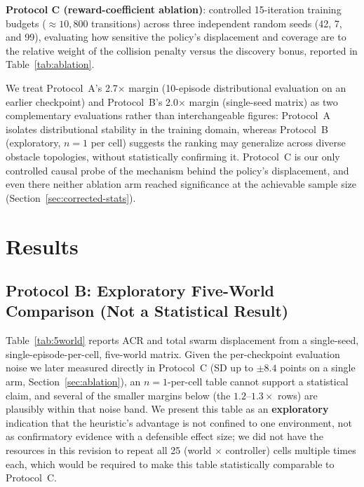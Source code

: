 \documentclass[11pt]{article}
\begin{document}
\noindent\textbf{Protocol C (reward-coefficient ablation)}: controlled
15-iteration training budgets ($\approx 10{,}800$ transitions) across
three independent random seeds (42, 7, and 99), evaluating how sensitive
the policy's displacement and coverage are to the relative weight of the
collision penalty versus the discovery bonus, reported in
Table~\ref{tab:ablation}.

We treat Protocol~A's 2.7$\times$ margin (10-episode distributional
evaluation on an earlier checkpoint) and Protocol~B's 2.0$\times$ margin
(single-seed matrix) as two complementary evaluations rather than
interchangeable figures: Protocol~A isolates distributional stability in
the training domain, whereas Protocol~B (exploratory, $n{=}1$ per cell)
suggests the ranking may generalize across diverse obstacle topologies,
without statistically confirming it. Protocol~C is our only controlled
causal probe of the mechanism behind the policy's displacement, and even
there neither ablation arm reached significance at the achievable sample
size (Section~\ref{sec:corrected-stats}).

\section{Results}
\label{sec:results}

\subsection{Protocol B: Exploratory Five-World Comparison (Not a Statistical Result)}
Table~\ref{tab:5world} reports ACR and total swarm displacement from a
single-seed, single-episode-per-cell, five-world matrix. Given the
per-checkpoint evaluation noise we later measured directly in Protocol~C
(SD up to $\pm 8.4$ points on a single arm, Section~\ref{sec:ablation}),
an $n{=}1$-per-cell table cannot support a statistical claim, and several
of the smaller margins below (the $1.2$--$1.3\times$ rows) are plausibly
within that noise band. We present this table as an \textbf{exploratory}
indication that the heuristic's advantage is not confined to one
environment, not as confirmatory evidence with a defensible effect size;
we did not have the resources in this revision to repeat all 25
(world $\times$ controller) cells multiple times each, which would be
required to make this table statistically comparable to Protocol~C.
\end{document}
